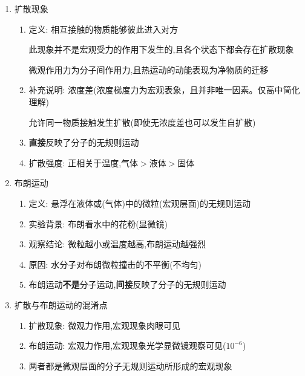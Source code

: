 \documentclass{article}
\begin{document}
\begin{enumerate}
    \item 扩散现象
          \begin{enumerate}[label = (\arabic*)]
              \item 定义: 相互接触的物质能够彼此进入对方

                    \hspace{2.7em}此现象并不是宏观受力的作用下发生的,且各个状态下都会存在扩散现象

                    \hspace{2.7em}微观作用力为分子间作用力,且热运动的动能表现为净物质的迁移
              \item 补充说明: 浓度差(浓度梯度力为宏观表象，且并非唯一因素。仅高中简化理解)
              
                    \hspace{4.7em}允许同一物质接触发生扩散(即使无浓度差也可以发生自扩散)
              \item \textbf{直接}反映了分子的无规则运动
              \item 扩散强度: 正相关于温度,气体$>$液体$>$固体
          \end{enumerate}
    \item 布朗运动
          \begin{enumerate}[label = (\arabic*)]
              \item 定义: 悬浮在液体或(气体)中的微粒(宏观层面)的无规则运动
              \item 实验背景: 布朗看水中的花粉(显微镜)
              \item 观察结论: 微粒越小或温度越高,布朗运动越强烈
              \item 原因: 水分子对布朗微粒撞击的不平衡(不均匀)
              \item 布朗运动\textbf{不是}分子运动,\textbf{间接}反映了分子的无规则运动
          \end{enumerate}
    \item 扩散与布朗运动的混淆点
          \begin{enumerate}[label = (\arabic*)]
              \item 扩散现象: 微观力作用,宏观现象肉眼可见
              \item 布朗运动: 宏观力作用,宏观现象光学显微镜观察可见($10^{-6}$)
              \item 两者都是微观层面的分子无规则运动所形成的宏观现象
          \end{enumerate}
\end{enumerate}
\end{document}

